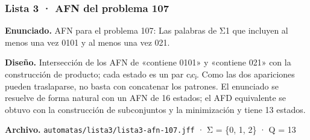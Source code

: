 
\hypertarget{lista-3-afn-del-problema-107}{%
\subsubsection{Lista 3 · AFN del problema 107}\label{lista-3-afn-del-problema-107}}

\textbf{Enunciado.} AFN para el problema 107: Las palabras de Σ1 que incluyen al menos una vez 0101 y al menos una vez 021.

\textbf{Diseño.} Intersección de los AFN de «contiene 0101» y «contiene 021» con la construcción de producto; cada estado es un par cᵢcⱼ. Como las dos apariciones pueden traslaparse, no basta con concatenar los patrones. El enunciado se resuelve de forma natural con un AFN de 16 estados; el AFD equivalente se obtuvo con la construcción de subconjuntos y la minimización y tiene 13 estados.

\textbf{Archivo.} \texttt{automatas/lista3/lista3-afn-107.jff} · Σ = \{0, 1, 2\} · \textbar Q\textbar{} = 13

